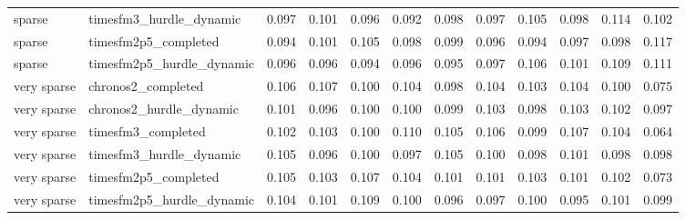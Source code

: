 \begin{table}[htbp]
\begin{tabular}{llrrrrrrrrrr}
sparse & timesfm3\_hurdle\_dynamic & 0.097 & 0.101 & 0.096 & 0.092 & 0.098 & 0.097 & 0.105 & 0.098 & 0.114 & 0.102 \\
sparse & timesfm2p5\_completed & 0.094 & 0.101 & 0.105 & 0.098 & 0.099 & 0.096 & 0.094 & 0.097 & 0.098 & 0.117 \\
sparse & timesfm2p5\_hurdle\_dynamic & 0.096 & 0.096 & 0.094 & 0.096 & 0.095 & 0.097 & 0.106 & 0.101 & 0.109 & 0.111 \\
very sparse & chronos2\_completed & 0.106 & 0.107 & 0.100 & 0.104 & 0.098 & 0.104 & 0.103 & 0.104 & 0.100 & 0.075 \\
very sparse & chronos2\_hurdle\_dynamic & 0.101 & 0.096 & 0.100 & 0.100 & 0.099 & 0.103 & 0.098 & 0.103 & 0.102 & 0.097 \\
very sparse & timesfm3\_completed & 0.102 & 0.103 & 0.100 & 0.110 & 0.105 & 0.106 & 0.099 & 0.107 & 0.104 & 0.064 \\
very sparse & timesfm3\_hurdle\_dynamic & 0.105 & 0.096 & 0.100 & 0.097 & 0.105 & 0.100 & 0.098 & 0.101 & 0.098 & 0.098 \\
very sparse & timesfm2p5\_completed & 0.105 & 0.103 & 0.107 & 0.104 & 0.101 & 0.101 & 0.103 & 0.101 & 0.102 & 0.073 \\
very sparse & timesfm2p5\_hurdle\_dynamic & 0.104 & 0.101 & 0.109 & 0.100 & 0.096 & 0.097 & 0.100 & 0.095 & 0.101 & 0.099 \\
\bottomrule
\end{tabular}
\end{table}
